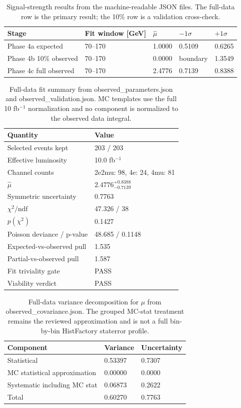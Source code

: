 \documentclass[11pt]{article}
\begin{document}
\begin{table}[htbp]
\centering
\caption{Signal-strength results from the machine-readable JSON files. The full-data row is the primary result; the 10\% row is a validation cross-check.}
\begin{tabular}{lllll}
\toprule
Stage & Fit window [GeV] & $\hat{\mu}$ & $-1\sigma$ & $+1\sigma$ \\
\midrule
Phase 4a expected & 70--170 & 1.0000 & 0.5109 & 0.6265 \\
Phase 4b 10\% observed & 70--170 & 0.0000 & boundary & 1.3549 \\
Phase 4c full observed & 70--170 & 2.4776 & 0.7139 & 0.8388 \\
\bottomrule
\end{tabular}
\label{tab:mu-result}
\end{table}

\begin{table}[htbp]
\centering
\caption{Full-data fit summary from observed\_parameters.json and observed\_validation.json. MC templates use the full 10 fb$^{-1}$ normalization and no component is normalized to the observed data integral.}
\begin{tabular}{ll}
\toprule
Quantity & Value \\
\midrule
Selected events kept & 203 / 203 \\
Effective luminosity & 10.0 fb$^{-1}$ \\
Channel counts & 2e2mu: 98, 4e: 24, 4mu: 81 \\
$\hat{\mu}$ & $2.4776^{+0.8388}_{-0.7139}$ \\
Symmetric uncertainty & 0.7763 \\
$\chi^2/\mathrm{ndf}$ & 47.326 / 38 \\
$p(\chi^2)$ & 0.1427 \\
Poisson deviance / p-value & 48.685 / 0.1148 \\
Expected-vs-observed pull & 1.535 \\
Partial-vs-observed pull & 1.587 \\
Fit triviality gate & PASS \\
Viability verdict & PASS \\
\bottomrule
\end{tabular}
\label{tab:observed-gof}
\end{table}

\begin{table}[htbp]
\centering
\caption{Full-data variance decomposition for $\mu$ from observed\_covariance.json. The grouped MC-stat treatment remains the reviewed approximation and is not a full bin-by-bin HistFactory staterror profile.}
\begin{tabular}{lll}
\toprule
Component & Variance & Uncertainty \\
\midrule
Statistical & 0.53397 & 0.7307 \\
MC statistical approximation & 0.00000 & 0.0000 \\
Systematic including MC stat & 0.06873 & 0.2622 \\
Total & 0.60270 & 0.7763 \\
\bottomrule
\end{tabular}
\label{tab:variance}
\end{table}
\end{document}
